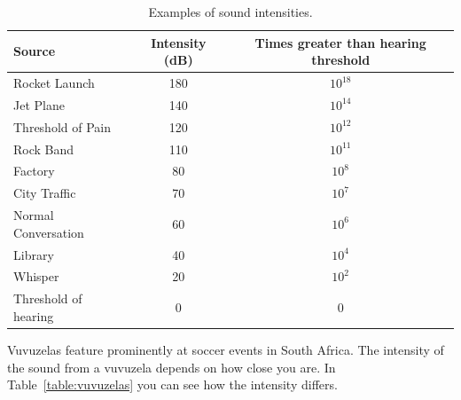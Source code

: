 \begin{table}[H]
\begin{center}
\begin{tabular}{|l|c|c|}\hline
\textbf{Source}&\textbf{Intensity} (dB) & \textbf{Times greater than hearing threshold}\\\hline
Rocket Launch &180 & $10^{18}$\\
Jet Plane & 140 & $10^{14}$ \\
Threshold of Pain & 120 & $10^{12}$\\
Rock Band & 110 & $10^{11}$\\
Factory & 80 & $10^{8}$\\
City Traffic & 70 & $10^{7}$\\
Normal Conversation & 60 & $10^{6}$\\
Library & 40 & $10^{4}$\\
Whisper & 20 & $10^{2}$\\
Threshold of hearing & 0 & 0\\
\hline
\end{tabular}
\end{center}
\caption{Examples of sound intensities.}
\label{p:wsl:s11:intensity}
\end{table}

Vuvuzelas feature prominently at soccer events in South Africa. The intensity of the sound from a vuvuzela depends on how close you are. In Table~\ref{table:vuvuzelas} you can see how the intensity differs.

